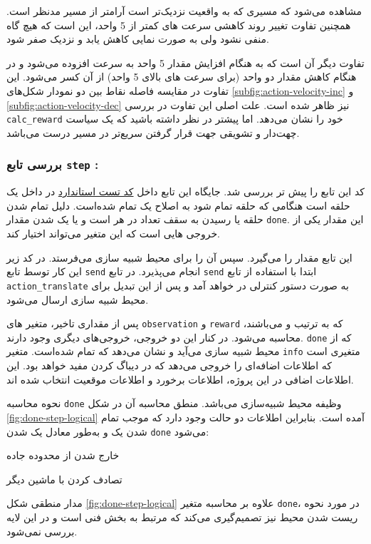 مشاهده می‌شود که مسیری که به واقعیت نزدیک‌تر است آرامتر از مسیر مدنظر است. همچنین تفاوت تغییر روند کاهشی سرعت های کمتر از 5 واحد، این است که هیچ گاه منفی نشود ولی به صورت نمایی کاهش یابد و نزدیک صفر شود.

 تفاوت دیگر آن است که به هنگام افزایش مقدار 5 واحد به سرعت افزوده می‌شود و در هنگام کاهش مقدار دو واحد (برای سرعت های بالای 5 واحد) از آن کسر می‌شود. این تفاوت در مقایسه فاصله نقاط بین دو نمودار شکل‌های \ref{subfig:action-velocity-inc} و  \ref{subfig:action-velocity-dec} نیز ظاهر شده است. علت اصلی این تفاوت در بررسی \texttt{calc\_reward} خود را نشان می‌دهد. اما پیشتر در نظر داشته باشید که یک سیاست چهت‌دار و تشویقی جهت قرار گرفتن سریع‌تر در مسیر درست می‌باشد.
 
\subsubsection{بررسی تابع \textbf{\texttt{step} :}}

کد این تابع را پیش تر بررسی شد. جایگاه این تابع داخل 
\hyperref[code:standard-test]{کد تست استاندارد}
در داخل یک حلقه است هنگامی که حلقه تمام شود به اصلاح یک  تمام شده‌است. دلیل تمام شدن حلقه یا رسیدن به سقف تعداد  در هر  است و یا یک شدن مقدار \texttt{done}. این مقدار یکی از خروجی هایی است که این متغیر می‌تواند اختیار کند.
 
این تابع مقدار  را می‌گیرد. سپس آن را برای محیط شبیه سازی می‌فرستد. در کد زیر این کار توسط تابع \texttt{send} انجام می‌پذیرد. در تابع \texttt{send} ابتدا با استفاده از تابع \texttt{action\_translate} به صورت دستور کنترلی در خواهد آمد و پس از این تبدیل برای محیط شبیه سازی ارسال می‌شود.

پس از مقداری تاخیر، متغیر های \texttt{observation} و  \texttt{reward} که به ترتیب  و  می‌باشند، محاسبه می‌شود. در کنار این دو خروجی، خروجی‌های دیگری وجود دارند. \texttt{done} که از محیط شبیه سازی می‌آید و نشان می‌دهد که  تمام شده‌است. متغیر \texttt{info} متغیری است که اطلاعات اضافه‌ای را خروجی می‌دهد که در دیباگ کردن مفید خواهد بود. این اطلاعات اضافی در این پروژه، اطلاعات برخورد و اطلاعات موقعیت  انتخاب شده اند.

\begin{note}
	نحوه محاسبه \texttt{done} وظیفه محیط شبیه‌سازی می‌باشد. منطق محاسبه آن در شکل \ref{fig:done-step-logical} آمده است.  بنابراین اطلاعات دو حالت وجود دارد که موجب تمام شدن یک  و به‌طور معادل یک شدن \texttt{done} می‌شود: 
	\begin{alphabetlist}
		\item خارج شدن از محدوده جاده
		\item تصادف کردن با ماشین دیگر
	\end{alphabetlist}
\end{note}
\begin{note}
	مدار منطقی شکل \ref{fig:done-step-logical} علاوه بر محاسبه متغیر \texttt{done}، در مورد نحوه ریست شدن محیط نیز تصمیم‌گیری می‌کند که مرتبط به بخش فنی است و در این لایه بررسی ‌نمی‌شود.
\end{note}

